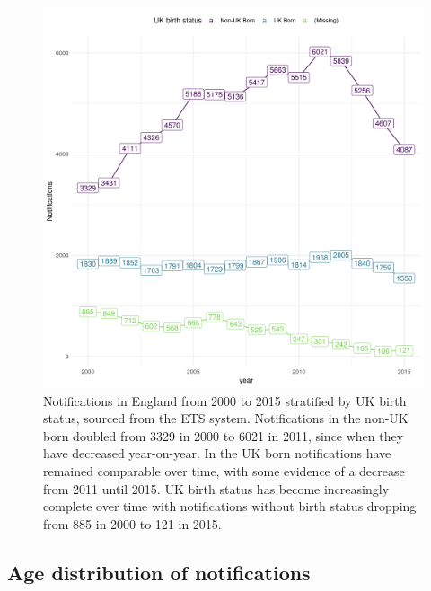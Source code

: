 \documentclass[11pt,twoside]{bristolthesis}
\begin{document}
  \begin{figure}
  
  {\centering \includegraphics[width=0.8\linewidth,]{chapters/tb-epi-england/figures/plot-overall-nots} 
  
  }
  
  \caption[Notifications in England from 2000 to 2015 stratified by UK birth status, sourced from the ETS system.]{Notifications in England from 2000 to 2015 stratified by UK birth status, sourced from the ETS system. Notifications in the non-UK born doubled from 3329 in 2000 to 6021 in 2011, since when they have decreased year-on-year. In the UK born notifications have remained comparable over time, with some evidence of a decrease from 2011 until 2015. UK birth status has become increasingly complete over time with notifications without birth status dropping from 885 in 2000 to 121 in 2015.}\label{fig:plot-overall-nots}
  \end{figure}
  \hypertarget{age-dist-nots}{%
  \subsection{Age distribution of notifications}\label{age-dist-nots}}
  
\end{document}
